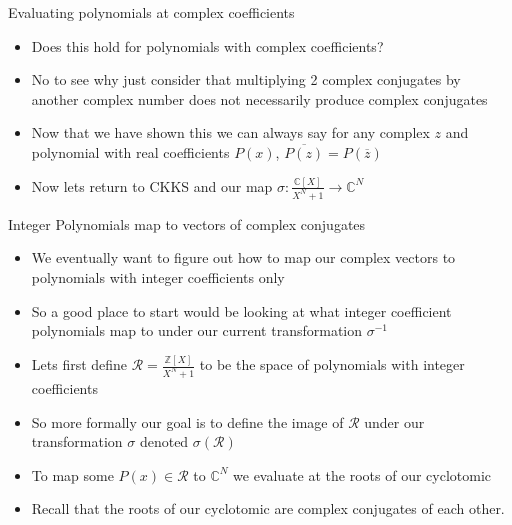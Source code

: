 \documentclass{beamer}
\begin{document}
\begin{frame}{Evaluating polynomials at complex coefficients}
	\begin{itemize}[<+->]
		\item Does this hold for polynomials with complex coefficients?
		\item No to see why just consider that multiplying 2 complex conjugates
		by another complex number does not necessarily produce complex conjugates
		\item Now that we have shown this we can always say for any complex
		$z$ and polynomial with real coefficients $P(x)$, $\overline{P(z)} = P(\overline{z})$
		\item Now lets return to CKKS and our map $\sigma : \frac{\mathbb{C}[X]}{X^N+1} \to \mathbb{C}^N$
	\end{itemize}
\end{frame}

\begin{frame}{Integer Polynomials map to vectors of complex conjugates}
	\begin{itemize}[<+->]
		\item We eventually want to figure out how to map our complex vectors to polynomials with integer coefficients only
		\item So a good place to start would be looking at what integer coefficient polynomials map to under our current transformation $\sigma^{-1}$
		\item Lets first define $\mathcal{R} = \frac{\mathbb{Z}[X]}{X^N + 1}$ to be the space of polynomials with integer coefficients
		\item So more formally our goal is to define the image of $\mathcal{R}$ under our transformation $\sigma$
		denoted $\sigma(\mathcal{R})$
		\item To map some $P(x) \in \mathcal{R}$ to $\mathbb{C}^N$ we evaluate at the roots of our cyclotomic
		\item Recall that the roots of our cyclotomic are complex conjugates of each other. 
	\end{itemize}
\end{frame}
\end{document}
